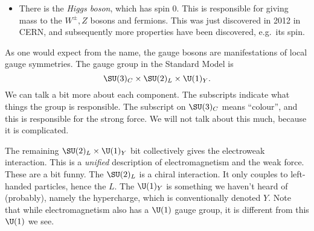 \documentclass[a4paper]{article}
\begin{document}
\begin{itemize}
  \item There is the \emph{Higgs boson}, which has spin 0. This is responsible for giving mass to the $W^{\pm}, Z$ bosons and fermions. This was just discovered in 2012 in CERN, and subsequently more properties have been discovered, e.g.\ its spin.
\end{itemize}

As one would expect from the name, the gauge bosons are manifestations of local gauge symmetries. The gauge group in the Standard Model is
\[
  \SU(3)_C \times \SU(2)_L \times \U(1)_Y.
\]
We can talk a bit more about each component. The subscripts indicate what things the group is responsible. The subscript on $\SU(3)_C$ means ``colour'', and this is responsible for the strong force. We will not talk about this much, because it is complicated.

The remaining $\SU(2)_L \times \U(1)_Y$ bit collectively gives the electroweak interaction. This is a \emph{unified} description of electromagnetism and the weak force. These are a bit funny. The $\SU(2)_L$ is a chiral interaction. It only couples to left-handed particles, hence the $L$. The $\U(1)_Y$ is something we haven't heard of (probably), namely the hypercharge, which is conventionally denoted $Y$. Note that while electromagnetism also has a $\U(1)$ gauge group, it is different from this $\U(1)$ we see.
\end{document}
